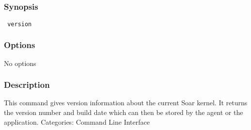 \subsection{}
\label{version}
\subsubsection*{Synopsis}
\begin{verbatim}
 version
\end{verbatim}
\subsubsection*{Options}
 No options 
\subsubsection*{Description}
 This command gives version information about the current Soar kernel. It returns the version number and build date which can then be stored by the agent or the application. 
 Categories: Command Line Interface

